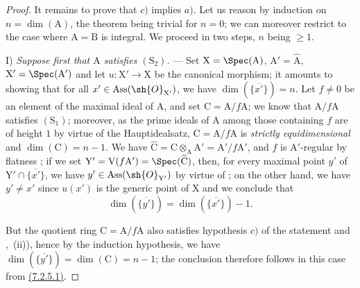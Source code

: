 \begin{proof}

It remains to prove that $c)$ implies $a)$.
Let us reason by induction on $n=\dim(\mathrm{A})$, the theorem being trivial for $n=0$; we can moreover restrict to the case where $\mathrm{A}=\mathrm{B}$ is integral.
We proceed in two steps, $n$ being $\geqslant 1$.

\medskip\noindent
I) \emph{Suppose first that $\mathrm{A}$ satisfies $(\mathrm{S}_2)$.} ---
Set $\mathrm{X}=\Spec(\mathrm{A})$, $\mathrm{A}'=\widehat{\mathrm{A}}$, $\mathrm{X}'=\Spec(\mathrm{A}')$ and let $u:\mathrm{X}'\to\mathrm{X}$ be the canonical morphism; it amounts to showing that for all $x'\in\operatorname{Ass}(\sh{O}_{\mathrm{X}'})$, we have $\dim(\overline{\{x'\}})=n$.
Let $f\neq 0$ be an element of the maximal ideal of $\mathrm{A}$, and set $\mathrm{C}=\mathrm{A}/f\mathrm{A}$; we know  that $\mathrm{A}/f\mathrm{A}$ satisfies $(\mathrm{S}_1)$; moreover, as the prime ideals of $\mathrm{A}$ among those containing $f$ are of height $1$ by virtue of the Hauptidealsatz, $\mathrm{C}=\mathrm{A}/f\mathrm{A}$ is \emph{strictly equidimensional} and $\dim(\mathrm{C})=n-1$.
We have $\widehat{\mathrm{C}}=\mathrm{C}\otimes_\mathrm{A}\mathrm{A}'=\mathrm{A}'/f\mathrm{A}'$, and $f$ is $\mathrm{A}'$-regular by flatness ; if we set $\mathrm{Y}'=\mathrm{V}(f\mathrm{A}')=\Spec(\widehat{\mathrm{C}})$, then, for every maximal point $y'$ of $\mathrm{Y}'\cap\overline{\{x'\}}$, we have $y'\in\operatorname{Ass}(\sh{O}_{\mathrm{Y}'})$ by virtue of ; on the other hand, we have $y'\neq x'$ since $u(x')$ is the generic point of $\mathrm{X}$  and we conclude  that
\[
  \dim(\overline{\{y'\}})=\dim(\overline{\{x'\}})-1.
  \tag{7.2.5.1}
\label{IV.7.2.5.1}
\]

But the quotient ring $\mathrm{C}=\mathrm{A}/f\mathrm{A}$ also satisfies hypothesis $c)$ of the statement  and ,~(ii)), hence by the induction hypothesis, we have $\dim(\overline{\{y'\}})=\dim(\mathrm{C})=n-1$; the conclusion therefore follows in this case from \hyperref[IV.7.2.5.1]{(7.2.5.1)}.


\end{proof}

